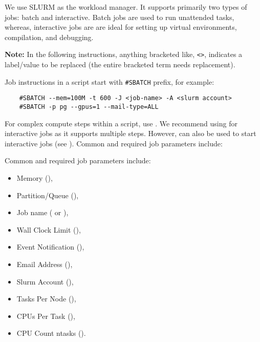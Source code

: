 
We use SLURM as the workload manager. It supports primarily two types of jobs:
batch and interactive. Batch jobs are used to run unattended tasks, whereas,
interactive jobs are are ideal for setting up virtual environments, compilation, and debugging.

\noindent\textbf{Note:} In the following instructions, anything bracketed like, \verb+<>+,
indicates a label/value to be replaced (the entire bracketed term needs replacement).

\noindent Job instructions in a script start with \verb+#SBATCH+ prefix, for example:
\begin{verbatim}
    #SBATCH --mem=100M -t 600 -J <job-name> -A <slurm account>
    #SBATCH -p pg --gpus=1 --mail-type=ALL
\end{verbatim}

For complex compute steps within a script, use . We recommend using 
for interactive jobs as it supports multiple steps. However, 
can also be used to start interactive jobs (see ).
Common and required job parameters include:

Common and required job parameters include:
\begin{itemize}
	\item Memory (),
	\item Partition/Queue (),
	\item Job name ( or ),
	\item Wall Clock Limit (),
	\item Event Notification (),
	\item Email Address (),
	\item Slurm Account (),
	\item Tasks Per Node (),
	\item CPUs Per Task (),
	\item CPU Count ntasks ().
\end{itemize}

